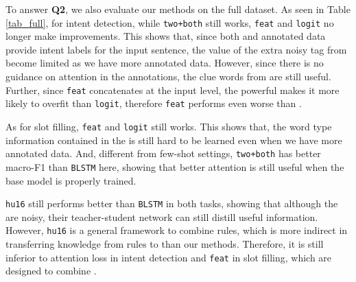 To answer \textbf{Q2}, we also evaluate our methods on the full dataset.
As seen in Table \ref{tab_full}, for intent detection, while \texttt{two+both} still works, \texttt{feat} and \texttt{logit} no longer make improvements.
This shows that, since both \REtag and annotated data provide intent labels for the input sentence, the value of the extra noisy tag from \RE become limited as we have more annotated data.
However, since there is no guidance on attention in the annotations, the clue words from \RE are still useful.
Further, since \texttt{feat} concatenates \REtags at the input level, the powerful \NN {} makes it more likely to overfit than \texttt{logit}, therefore \texttt{feat} performs even worse than \BLSTM.

As for slot filling, \texttt{feat} and \texttt{logit} still works.
This shows that, the word type information contained in the \REtags is still hard to be learned even when we have more annotated data.
And, different from few-shot settings, \texttt{two+both} has better macro-F1 than \texttt{BLSTM} here, showing that better attention is still useful when the base model is properly trained.

\texttt{hu16} still performs better than \texttt{BLSTM} in both tasks, showing that although the \REtags are noisy, their teacher-student network can still distill useful information.
However, \texttt{hu16} is a general framework to combine \FOL rules, which is more indirect in transferring knowledge from rules to \NN than our methods. Therefore, it is still  inferior to attention loss in intent detection and \texttt{feat} in slot filling, which are designed to combine \REs.

